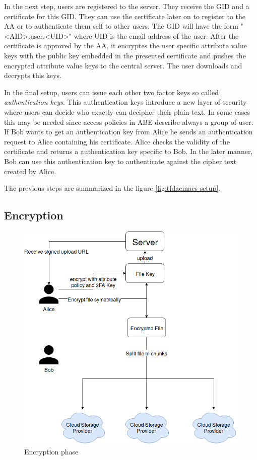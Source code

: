 In the next step, users are registered to the server. They receive the GID and a certificate for this GID. They can use the certificate later on to register to the AA or to authenticate them self to other users. The GID will have the form "<AID>.user.<UID>" where UID is the email address of the user. After the certificate is approved by the AA, it encryptes the user specific attribute value keys with the public key embedded in the presented certificate and pushes the encrypted attribute value keys to the central server. The user downloads and decrypts this keys. 

In the final setup, users can issue each other two factor keys so called \textit{authentication keys}. This authentication keys introduce a new layer of security where users can decide who exactly can decipher their plain text. In some cases this may be needed since access policies in ABE describe always a group of user. 
If Bob wants to get an authentication key from Alice he sends an authentication request to Alice containing his certificate. Alice checks the validity of the certificate and returns a authentication key specific to Bob. In the later manner, Bob can use this authentication key to authenticate against the cipher text created by Alice. 

The previous steps are summarized in the figure \ref{fig:tfdacmacs-setup}.

\subsection{Encryption}
\begin{figure}[!t]
\centering
    \includegraphics[width=\linewidth]{img/TF-DAC-MACS-overview-encrypt.png}
    \caption{Encryption phase}
    \label{fig:tfdacmacs-encrypt}
\end{figure}

